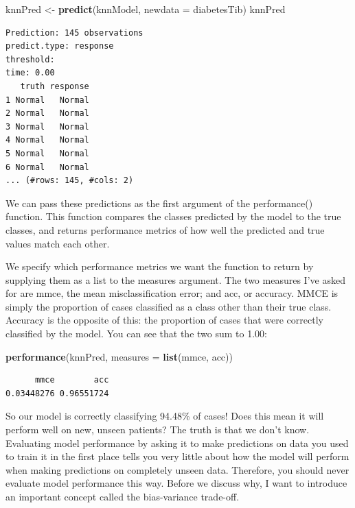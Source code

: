 \documentclass[
]{article}
\newenvironment{Shaded}{\begin{snugshade}}{\end{snugshade}}
\newcommand{\AttributeTok}[1]{\textcolor[rgb]{0.13,0.29,0.53}{#1}}
\newcommand{\FunctionTok}[1]{\textcolor[rgb]{0.13,0.29,0.53}{\textbf{#1}}}
\newcommand{\NormalTok}[1]{#1}
\newcommand{\OtherTok}[1]{\textcolor[rgb]{0.56,0.35,0.01}{#1}}
\begin{document}
\begin{Shaded}
\begin{Highlighting}[]
\NormalTok{knnPred }\OtherTok{\textless{}{-}} \FunctionTok{predict}\NormalTok{(knnModel, }\AttributeTok{newdata =}\NormalTok{ diabetesTib)}
\NormalTok{knnPred}
\end{Highlighting}
\end{Shaded}

\begin{verbatim}
Prediction: 145 observations
predict.type: response
threshold: 
time: 0.00
   truth response
1 Normal   Normal
2 Normal   Normal
3 Normal   Normal
4 Normal   Normal
5 Normal   Normal
6 Normal   Normal
... (#rows: 145, #cols: 2)
\end{verbatim}

We can pass these predictions as the first argument of the performance()
function. This function compares the classes predicted by the model to
the true classes, and returns performance metrics of how well the
predicted and true values match each other.

We specify which performance metrics we want the function to return by
supplying them as a list to the measures argument. The two measures I've
asked for are mmce, the mean misclassification error; and acc, or
accuracy. MMCE is simply the proportion of cases classified as a class
other than their true class. Accuracy is the opposite of this: the
proportion of cases that were correctly classified by the model. You can
see that the two sum to 1.00:

\begin{Shaded}
\begin{Highlighting}[]
\FunctionTok{performance}\NormalTok{(knnPred, }\AttributeTok{measures =} \FunctionTok{list}\NormalTok{(mmce, acc))}
\end{Highlighting}
\end{Shaded}

\begin{verbatim}
      mmce        acc 
0.03448276 0.96551724 
\end{verbatim}

So our model is correctly classifying 94.48\% of cases! Does this mean
it will perform well on new, unseen patients? The truth is that we don't
know. Evaluating model performance by asking it to make predictions on
data you used to train it in the first place tells you very little about
how the model will perform when making predictions on completely unseen
data. Therefore, you should never evaluate model performance this way.
Before we discuss why, I want to introduce an important concept called
the bias-variance trade-off.
\end{document}
